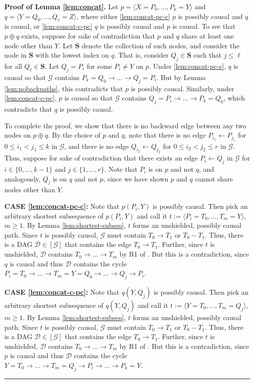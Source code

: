 \documentclass[11pt]{article}
\newcommand{\BlackBox}{\rule{1.5ex}{1.5ex}}  %
\newcommand{\mb}[1]{\mathbf{#1}}
\newcommand{\g}[1][G]{\mathcal{#1}}
\newenvironment{proofof}[1][]{\noindent \textbf{Proof of #1.}}{\hfill\BlackBox}
\begin{document}
\begin{proofof}[Lemma \ref{lem:concat}]
    Let $p= \langle X=P_0, \dots, P_k=Y \rangle$ and $q= \langle Y=Q_0, \dots, Q_r=Z \rangle$, where either \ref{lem:concat-pc-c} $p$ is possibly causal and $q$ is causal, or \ref{lem:concat-c-pc} $q$ is possibly causal and $p$ is causal. To see that $p \oplus q$ exists, suppose for sake of contradiction that $p$ and $q$ share at least one node other than $Y$. Let $\mb{S}$ denote the collection of such nodes, and consider the node in $\mb{S}$ with the lowest index on $q$. That is, consider $Q_j \in \mb{S}$ such that $j \le \ell$ for all $Q_{\ell} \in \mb{S}$. Let $Q_j=P_i$ for some $P_i \neq Y$ on $p$. Under \ref{lem:concat-pc-c}, $q$ is causal so that $\g$ contains $P_k=Q_0 \to \dots \to Q_j=P_i$. But by Lemma \ref{lem:nobackpaths}, this contradicts that $p$ is possibly causal. Similarly, under \ref{lem:concat-c-pc}, $p$ is causal so that $\g$ contains $Q_j=P_i \to \dots \to P_k = Q_0$, which contradicts that $q$ is possibly causal.    

    To complete the proof, we show that there is no backward edge between any two nodes on $p \oplus q$. By the choice of $p$ and $q$, note that there is no edge $P_{i_1} \gets P_{j_1}$ for $0 \le i_1 < j_1 \le k$ in $\g$, and there is no edge $Q_{i_2} \gets Q_{j_2}$ for $0 \le i_2 < j_2 \le r$ in $\g$. Thus, suppose for sake of contradiction that there exists an edge $P_i \gets Q_j$ in $\g$ for $i \in \{0, \dots, k-1\}$ and $j \in \{1, \dots, r\}$. Note that $P_i$ is on $p$ and not $q$, and analogously, $Q_j$ is on $q$ and not $p$, since we have shown $p$ and $q$ cannot share nodes other than $Y$.

    
    \textbf{CASE \ref{lem:concat-pc-c}:}
    Note that $p(P_i, Y)$ is possibly causal. Then pick an arbitrary shortest subsequence of $p(P_i, Y)$ and call it $t :=\langle P_i=T_0, \dots, T_m=Y \rangle$, $m \ge 1$. By Lemma \ref{lem:shortest-subseq}, $t$ forms an unshielded, possibly causal path. Since $t$ is possibly causal, $\g$ must contain $T_0 \to T_1$ or $T_0 - T_1$. Thus, there is a DAG $\g[D] \in [\g]$ that contains the edge $T_0 \to T_1$. Further, since $t$ is unshielded, $\g[D]$ contains $T_0 \to \dots \to T_m$ by R1 of \cite{meek1995causal}. But this is a contradiction, since $q$ is causal and thus $\g[D]$ contains the cycle $P_i=T_0 \to \dots \to {T_m=Y=Q_0} \to \dots \to Q_j \to P_i$.

    \textbf{CASE \ref{lem:concat-c-pc}:}
    Note that $q(Y, Q_j)$ is possibly causal. Then pick an arbitrary shortest subsequence of $q(Y, Q_j)$ and call it $t :=\langle Y=T_0, \dots, T_m=Q_j \rangle$, $m \ge 1$. By Lemma \ref{lem:shortest-subseq}, $t$ forms an unshielded, possibly causal path. Since $t$ is possibly causal, $\g$ must contain $T_0 \to T_1$ or $T_0 - T_1$. Thus, there is a DAG $\g[D] \in [\g]$ that contains the edge $T_0 \to T_1$. Further, since $t$ is unshielded, $\g[D]$ contains $T_0 \to \dots \to T_m$ by R1 of \cite{meek1995causal}. But this is a contradiction, since $p$ is causal and thus $\g[D]$ contains the cycle ${Y=T_0} \to \dots \to {T_m=Q_j} \to P_i \to \dots \to {P_k=Y}$.
\end{proofof}
\end{document}
